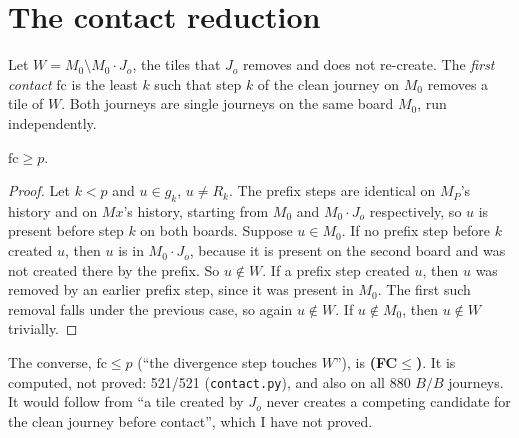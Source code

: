 \documentclass[11pt]{article}
\theoremstyle{definition}\newtheorem{definition}[theorem]{Definition}\newtheorem{remark}[theorem]{Remark}
\begin{document}
\section{The contact reduction}\label{sec:contact}
Let $W=M_0\setminus M_0\cdot J_o$, the tiles that $J_o$ removes and does not re-create. The \emph{first contact} $\mathrm{fc}$ is the least $k$ such that step $k$ of the clean journey on $M_0$ removes a tile of $W$. Both journeys are single journeys on the same board $M_0$, run independently.

\begin{proposition}\label{prop:fc}
$\mathrm{fc}\ge p$.
\end{proposition}
\begin{proof}
Let $k<p$ and $u\in g_k$, $u\ne R_k$. The prefix steps are identical on $M_P$'s history and on $Mx$'s history, starting from $M_0$ and $M_0\cdot J_o$ respectively, so $u$ is present before step $k$ on both boards.
Suppose $u\in M_0$. If no prefix step before $k$ created $u$, then $u$ is in $M_0\cdot J_o$, because it is present on the second board and was not created there by the prefix. So $u\notin W$.
If a prefix step created $u$, then $u$ was removed by an earlier prefix step, since it was present in $M_0$. The first such removal falls under the previous case, so again $u\notin W$. If $u\notin M_0$, then $u\notin W$ trivially.
\end{proof}
\noindent The converse, $\mathrm{fc}\le p$ (``the divergence step touches $W$''), is \textbf{(FC$\le$)}. It is computed, not proved: 521/521 (\texttt{contact.py}), and also on all 880 $B/B$ journeys. It would follow from ``a tile created by $J_o$ never creates a competing candidate for the clean journey before contact'', which I have not proved.
\end{document}

